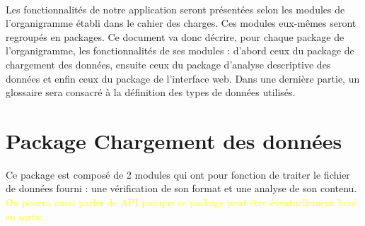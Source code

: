 		\paragraph{}Les fonctionnalités de notre application seront présentées selon les modules de l'organigramme établi dans le cahier des charges. Ces modules eux-mêmes seront regroupés en packages. Ce document va donc décrire, pour chaque package de l'organigramme, les fonctionnalités de ses modules : d'abord ceux du package de chargement des données, ensuite ceux du package d'analyse descriptive des données et enfin ceux du package de l'interface web. Dans une dernière partie, un glossaire sera consacré à la définition des types de données utilisés.
		
	\section{Package Chargement des données}
	Ce package est composé de 2 modules qui ont pour fonction de traiter le fichier de données fourni : une vérification de son format et une analyse de son contenu. \textcolor{yellow}{On pourra aussi parler de API puisque ce package peut être éventuellement livré en sortie.}
		
